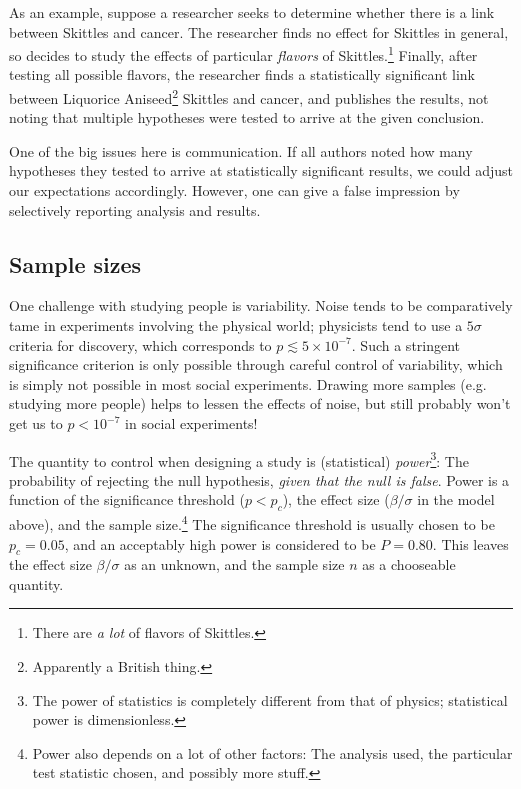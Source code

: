 \documentclass{tufte-handout}
\begin{document}
As an example, suppose a researcher seeks to determine whether there is a link
between Skittles and cancer. The researcher finds no effect for Skittles in
general, so decides to study the effects of particular \emph{flavors} of
Skittles.\footnote{There are \emph{a lot} of flavors of Skittles.} Finally, after
testing all possible flavors, the researcher finds a statistically significant
link between Liquorice Aniseed\footnote{Apparently a British thing.} Skittles and
cancer, and publishes the results, not noting that multiple hypotheses were
tested to arrive at the given conclusion.

One of the big issues here is communication. If all authors noted how many
hypotheses they tested to arrive at statistically significant results, we could
adjust our expectations accordingly. However, one can give a false impression
by selectively reporting analysis and results.

\subsection{Sample sizes}
\label{sec:orgf7be884}
One challenge with studying people is variability. Noise tends to be
comparatively tame in experiments involving the physical world; physicists tend
to use a \(5\sigma\) criteria for discovery, which corresponds to
\(p\lesssim5\times10^{-7}\).\cite{demortier2007p} Such a stringent significance
criterion is only possible through careful control of variability, which is
simply not possible in most social experiments. Drawing more samples (e.g.
studying more people) helps to lessen the effects of noise, but still probably
won't get us to \(p<10^{-7}\) in social experiments!

The quantity to control when designing a study is (statistical) \emph{power}\footnote{The
power of statistics is completely different from that of physics; statistical
power is dimensionless.}: The probability of rejecting the null hypothesis,
\emph{given that the null is false}. Power is a function of the significance
threshold (\(p<p_c\)), the effect size (\(\beta/\sigma\) in the model above), and
the sample size.\footnote{Power also depends on a lot of other factors: The analysis
used, the particular test statistic chosen, and possibly more stuff.} The
significance threshold is usually chosen to be \(p_c=0.05\), and an acceptably
high power is considered to be \(P=0.80\). This leaves the effect size
\(\beta/\sigma\) as an unknown, and the sample size \(n\) as a chooseable
quantity.
\end{document}
